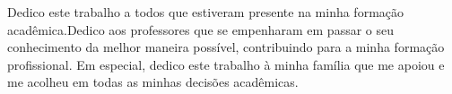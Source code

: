Dedico este trabalho a todos que estiveram presente na minha formação acadêmica.Dedico aos professores que se empenharam em passar o seu conhecimento da melhor maneira possível, contribuindo para  a minha formação profissional. Em especial, dedico este trabalho à minha família que me apoiou e me acolheu em todas as minhas decisões acadêmicas.